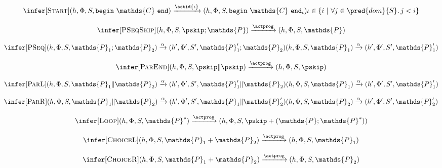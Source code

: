 \[
\infer[\textsc{Start}]
{
	(h, \Phi, S, \mathtt{begin}\ \mathds{C}\ \mathtt{end})
	\xrightarrow{\actid{\iota}}
	(h, \Phi, S, \mathtt{begin}\ \mathds{C}\ \mathtt{end}_\iota)
}
{
	\iota \in \{ i\ |\ \forall j \in \pred{dom}{S} \ldotp j < i \}
}
\]

\[
\infer[\textsc{PSeqSkip}]
{
	 (h, \Phi, S, \pskip; \mathds{P})
	\xrightarrow{\actprog}
	(h, \Phi, S, \mathds{P})
}
{}
\]

\[
\infer[\textsc{PSeq}]
{
	 (h, \Phi, S, \mathds{P}_1; \mathds{P}_2)
	\xrightarrow{\alpha}
	(h', \Phi', S', \mathds{P}_1'; \mathds{P}_2)
}
{
	 (h, \Phi, S, \mathds{P}_1)
	\xrightarrow{\alpha}
	(h', \Phi', S', \mathds{P}_1')
}
\]

\[
\infer[\textsc{ParEnd}]
{
	 (h, \Phi, S, \pskip \| \pskip)
	\xrightarrow{\actprog}
	(h, \Phi, S, \pskip)
}
{}
\]

\[
\infer[\textsc{ParL}]
{
	 (h, \Phi, S, \mathds{P}_1 \| \mathds{P}_2)
	\xrightarrow{\alpha}
	(h', \Phi', S', \mathds{P}_1' \| \mathds{P}_2)
}
{
	 (h, \Phi, S, \mathds{P}_1)
	\xrightarrow{\alpha}
	(h', \Phi', S', \mathds{P}_1')
}
\]

\[
\infer[\textsc{ParR}]
{
	 (h, \Phi, S, \mathds{P}_1 \| \mathds{P}_2)
	\xrightarrow{\alpha}
	(h', \Phi', S', \mathds{P}_1 \| \mathds{P}_2')
}
{
	 (h, \Phi, S, \mathds{P}_2)
	\xrightarrow{\alpha}
	(h', \Phi', S', \mathds{P}_2')
}
\]

\[
\infer[\textsc{Loop}]
{
	 (h, \Phi, S, \mathds{P}^*)
	\xrightarrow{\actprog}
	(h, \Phi, S, \pskip + (\mathds{P} ; \mathds{P}^*))
}
{}
\]

\[
\infer[\textsc{ChoiceL}]
{
	 (h, \Phi, S, \mathds{P}_1 + \mathds{P}_2)
	\xrightarrow{\actprog}
	(h, \Phi, S, \mathds{P}_1)
}
{}
\]

\[
\infer[\textsc{ChoiceR}]
{
	 (h, \Phi, S, \mathds{P}_1 + \mathds{P}_2)
	\xrightarrow{\actprog}
	(h, \Phi, S, \mathds{P}_2)
}
{}
\]
